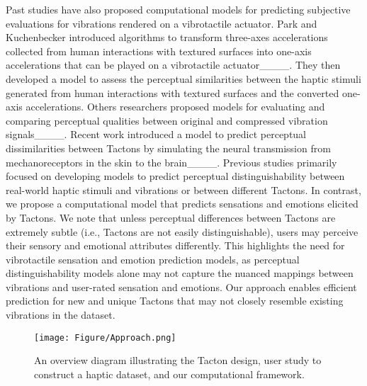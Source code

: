 Past studies have also proposed computational models for predicting subjective evaluations for vibrations rendered on a vibrotactile actuator.
Park and Kuchenbecker introduced algorithms to transform three-axes accelerations collected from human interactions with textured surfaces into one-axis accelerations that can be played on a vibrotactile actuator____.
They then developed a model to assess the perceptual similarities between the haptic stimuli generated from human interactions with textured surfaces and the converted one-axis accelerations.
Others researchers proposed models for evaluating and comparing perceptual qualities between original and compressed vibration signals____.
Recent work introduced a model to predict perceptual dissimilarities between Tactons by simulating the neural transmission from mechanoreceptors in the skin to the brain____.
Previous studies primarily focused on developing models to predict perceptual distinguishability between real-world haptic stimuli and vibrations or between different Tactons.
In contrast, we propose a computational model that predicts sensations and emotions elicited by Tactons.
We note that unless perceptual differences between Tactons are extremely subtle (i.e., Tactons are not easily distinguishable), users may perceive their sensory and emotional attributes differently. %
This highlights the need for vibrotactile sensation and emotion prediction models, as perceptual distinguishability models alone may not capture the nuanced mappings between vibrations and user-rated sensation and emotions.
Our approach enables efficient prediction for new and unique Tactons that may not closely resemble existing vibrations in the dataset.


\begin{figure*}[t]
  \centering
    \texttt{[image: Figure/Approach.png]}
    \caption{
    An overview diagram illustrating the Tacton design, user study to construct a haptic dataset, and our computational framework.
    }
  \label{fig:overview}
\end{figure*}
